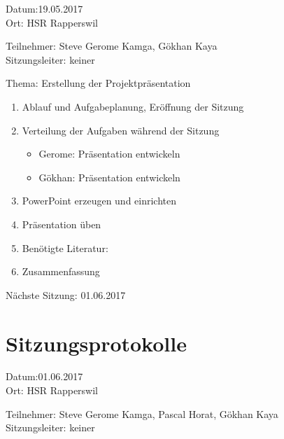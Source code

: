 Datum:19.05.2017\\

Ort: HSR Rapperswil

Teilnehmer: Steve Gerome Kamga, Gökhan Kaya\\

Sitzungsleiter: keiner

Thema: Erstellung der Projektpräsentation
\begin{enumerate}

\item Ablauf und Aufgabeplanung, Eröffnung der Sitzung 

\item  Verteilung der Aufgaben während der Sitzung
\begin{itemize}
\item Gerome: Präsentation entwickeln
\item Gökhan: Präsentation entwickeln
\end{itemize}

\item PowerPoint erzeugen und einrichten

\item Präsentation üben


\item Benötigte Literatur: 

\item Zusammenfassung

\end{enumerate}

Nächste Sitzung: 01.06.2017



\newpage
\section*{Sitzungsprotokolle}

Datum:01.06.2017\\
Ort: HSR Rapperswil

Teilnehmer: Steve Gerome Kamga, Pascal Horat, Gökhan Kaya\\
Sitzungsleiter: keiner

